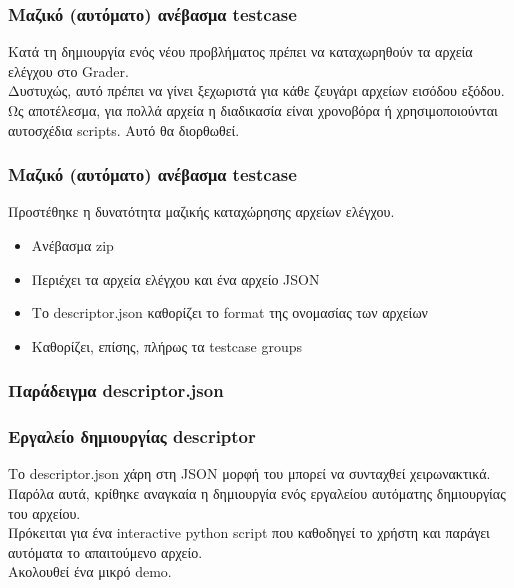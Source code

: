 \documentclass{beamer}
\begin{document}
\begin{frame}
  \frametitle{Μαζικό (αυτόματο) ανέβασμα testcase}

   Κατά τη δημιουργία ενός νέου προβλήματος πρέπει να καταχωρηθούν τα αρχεία
   ελέγχου στο Grader. \\[0.3cm]

   Δυστυχώς, αυτό πρέπει να γίνει ξεχωριστά για κάθε ζευγάρι αρχείων εισόδου
   εξόδου. \\[0.3cm]

   Ως αποτέλεσμα, για πολλά αρχεία η διαδικασία είναι χρονοβόρα ή χρησιμοποιούνται
   αυτοσχέδια scripts. Αυτό θα διορθωθεί.
\end{frame}

\begin{frame}
  \frametitle{Μαζικό (αυτόματο) ανέβασμα testcase}

  Προστέθηκε η δυνατότητα μαζικής καταχώρησης αρχείων ελέγχου.

  \begin{itemize}
      \item Ανέβασμα zip
      \item Περιέχει τα αρχεία ελέγχου και ένα αρχείο JSON
      \item Το descriptor.json καθορίζει το format της ονομασίας των αρχείων
      \item Καθορίζει, επίσης, πλήρως τα testcase groups
  \end{itemize}
\end{frame}

\begin{frame}
  \frametitle{Παράδειγμα descriptor.json}


\end{frame}

\begin{frame}
  \frametitle{Εργαλείο δημιουργίας descriptor}

  Το descriptor.json χάρη στη JSON μορφή του μπορεί να συνταχθεί χειρωνακτικά. \\[0.3cm]

  Παρόλα αυτά, κρίθηκε αναγκαία η δημιουργία ενός εργαλείου αυτόματης δημιουργίας
  του αρχείου.\\[0.3cm]

  Πρόκειται για ένα interactive python script που καθοδηγεί το χρήστη και παράγει
  αυτόματα το απαιτούμενο αρχείο. \\[0.3cm]

  Ακολουθεί ένα μικρό demo.
\end{frame}
\end{document}
